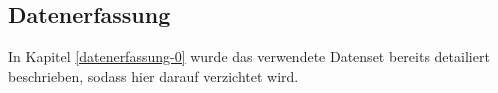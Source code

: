 \subsection{Datenerfassung} \label{datenerfassung-1}


In Kapitel \ref{datenerfassung-0} wurde das verwendete Datenset bereits detailiert beschrieben, sodass hier darauf verzichtet wird. \\